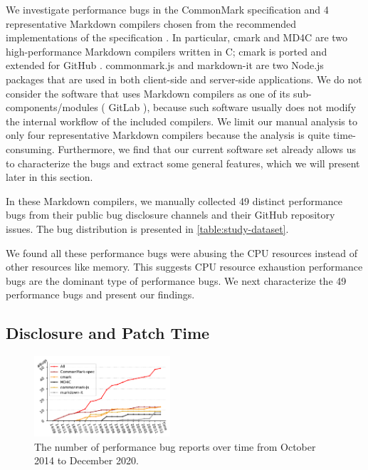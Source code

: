 We investigate performance bugs in the CommonMark specification \cite{commonmark-spec}
%
and 4 representative Markdown compilers chosen from the recommended implementations of the specification \cite{commonmark-spec-list}.
%
%
In particular, cmark \cite{cmark} and MD4C \cite{md4c} are two high-performance Markdown compilers written in C;
cmark is ported and extended for GitHub \cite{cmark-gfm}.
%
commonmark.js \cite{commonmarkjs} and markdown-it \cite{markdown-it} are two Node.js packages that are used in both client-side and server-side applications.
%
We do not consider the software that uses Markdown compilers as one of its sub-components/modules (\eg{,} GitLab \cite{gitlab}), because such software usually does not modify the internal workflow of the included compilers.
%
%
We limit our manual analysis to only four representative Markdown compilers because the analysis is quite time-consuming.
%
Furthermore, we find that our current software set already allows us to characterize the bugs and extract some general features,
%
which we will present later in this section.
%

In these Markdown compilers, we manually collected 49 distinct performance bugs from their public bug disclosure channels and their GitHub repository issues. %
%
The bug distribution is presented in \autoref{table:study-dataset}.
%

%
We found all these performance bugs were abusing the CPU resources instead of other resources like memory.
%
This suggests CPU resource exhaustion performance bugs are the dominant type of performance bugs.
%
%
We next characterize the 49 performance bugs and present our findings.

\subsection{Disclosure and Patch Time}
\label{s:study-time}
\begin{figure}[t]
    \centering
    \includegraphics[width=0.45\textwidth, trim =5 0 0 0,clip]{fig/disclosure-time.pdf}
    \caption{The number of performance bug reports over time from October 2014 to December 2020.
    }
    \label{fig:disclosure-time}
\end{figure}

